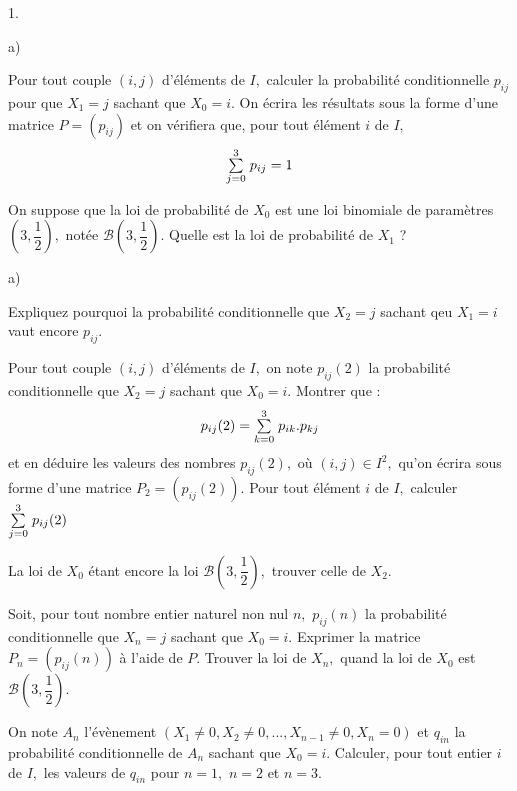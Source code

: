 \documentclass[11pt]{article}%
\begin{document}
\begin{noliste}{1.}
 \setlength{\itemsep}{4mm}
\item 

\begin{noliste}{a)}
 \setlength{\itemsep}{2mm}
\item Pour tout couple $(i,j)$ d'éléments de $I,$ calculer la
probabilité
conditionnelle $p_{ij}$ pour que $X_{1} = j$ sachant que $X_{0} = i.$
On écrira
les résultats sous la forme d'une matrice $P = (p_{ij})$ et on
vérifiera que,
pour tout élément $i$ de $I,$
\[
{\textstyle\sum\limits_{j = 0}^{3}}\hspace{.1cm}p_{ij} = 1
\]

\item On suppose que la loi de probabilité de $X_{0}$ est une loi
binomiale
de paramètres $(3,\dfrac{1}{2}),$ notée $\mathcal{B}(3,\dfrac{1}{2}).$
Quelle est la loi de probabilité de $X_{1}$ ?
\end{noliste}

\item 

\begin{noliste}{a)}
 \setlength{\itemsep}{2mm}
\item Expliquez pourquoi la probabilité conditionnelle que $X_{2} = j$
sachant
qeu $X_{1} = i$ vaut encore $p_{ij}.$

\item Pour tout couple $(i,j)$ d'éléments de $I,$ on note $p_{ij}{(2)}$
la
probabilité conditionnelle que $X_{2} = j$ sachant que $X_{0} = i.$
Montrer que :
\[
p_{ij}{(2)} = {\textstyle\sum\limits_{k = 0}^{3}}\hspace{.1cm}p_{ik}.p_{kj}
\]
et en déduire les valeurs des nombres $p_{ij}{(2)},$ où $(i,j)\in
I^{2},$
qu'on écrira sous forme d'une matrice $P_{2} = (p_{ij}{(2)}).$ Pour
tout élément $i$ de $I,$ calculer ${\textstyle\sum\limits_{j = 0}^{3}}\hspace{.1cm}p_{ij}{(2)}$

\item La loi de $X_{0}$ étant encore la loi
$\mathcal{B}(3,\dfrac{1}{2}),$
trouver celle de $X_{2}.$
\end{noliste}

\item Soit, pour tout nombre entier naturel non nul $n,$ $p_{ij}{(n)}$
la
probabilité conditionnelle que $X_{n} = j$ sachant que $X_{0} = i$.
Exprimer la
matrice $P_{n} = (p_{ij}{(n)})$ à l'aide de $P.$ Trouver la loi de
$X_{n},$
quand la loi de $X_{0}$ est $\mathcal{B}(3,\dfrac{1}{2}).$

\item On note $A_{n}$ l'évènement $(X_{1}\neq 0,X_{2}\neq
0,...,X_{n-1}\neq
0,X_{n} = 0)$ et $q_{in}$ la probabilité conditionnelle de $A_{n}$
sachant que 
$X_{0} = i.$ Calculer, pour tout entier $i$ de $I,$ les valeurs de
$q_{in}$
pour $n = 1,$ $n = 2$ et $n = 3.$
\end{noliste}

\label{fin}
\end{document}

